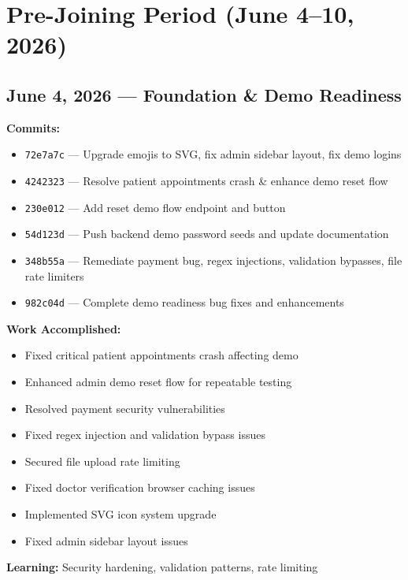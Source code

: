 \documentclass[11pt,a4paper]{article}
\begin{document}
\newpage

\section{Pre-Joining Period (June 4--10, 2026)}

\subsection{June 4, 2026 — Foundation \& Demo Readiness}

\textbf{Commits:}
\begin{itemize}
  \item \texttt{72e7a7c} — Upgrade emojis to SVG, fix admin sidebar layout, fix demo logins
  \item \texttt{4242323} — Resolve patient appointments crash \& enhance demo reset flow
  \item \texttt{230e012} — Add reset demo flow endpoint and button
  \item \texttt{54d123d} — Push backend demo password seeds and update documentation
  \item \texttt{348b55a} — Remediate payment bug, regex injections, validation bypasses, file rate limiters
  \item \texttt{982c04d} — Complete demo readiness bug fixes and enhancements
\end{itemize}

\textbf{Work Accomplished:}
\begin{itemize}
  \item Fixed critical patient appointments crash affecting demo
  \item Enhanced admin demo reset flow for repeatable testing
  \item Resolved payment security vulnerabilities
  \item Fixed regex injection and validation bypass issues
  \item Secured file upload rate limiting
  \item Fixed doctor verification browser caching issues
  \item Implemented SVG icon system upgrade
  \item Fixed admin sidebar layout issues
\end{itemize}

\textbf{Learning:} Security hardening, validation patterns, rate limiting
\end{document}

